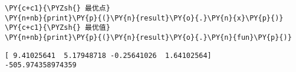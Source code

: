     \begin{tcolorbox}[breakable, size=fbox, boxrule=1pt, pad at break*=1mm,colback=cellbackground, colframe=cellborder]
\begin{Verbatim}[commandchars=\\\{\}]
\PY{c+c1}{\PYZsh{} 最优点}
\PY{n+nb}{print}\PY{p}{(}\PY{n}{result}\PY{o}{.}\PY{n}{x}\PY{p}{)}
\PY{c+c1}{\PYZsh{} 最优值}
\PY{n+nb}{print}\PY{p}{(}\PY{n}{result}\PY{o}{.}\PY{n}{fun}\PY{p}{)}
\end{Verbatim}
\end{tcolorbox}

    \begin{Verbatim}[commandchars=\\\{\}]
[ 9.41025641  5.17948718 -0.25641026  1.64102564]
-505.974358974359
    \end{Verbatim}
